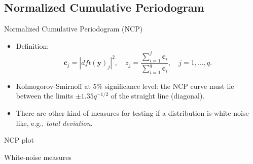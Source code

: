 \documentclass{beamer}
\begin{document}
\subsection{Normalized Cumulative Periodogram}
\begin{frame}{Normalized Cumulative Periodogram (NCP)}
  \begin{itemize}
    \item Definition:
      \begin{equation*}
	\mathbf{c}_{j} = |dft(\mathbf{y})_{j}|^{2}, \quad z_{j} =
	\frac{\sum_{i=1}^{j}\mathbf{c}_{i}}{\sum_{i=1}^{q}\mathbf{c}_{i}},
	\quad j = 1,\ldots,q.
      \end{equation*}

    \item Kolmogorov-Smirnoff at $5\%$ significance level: the NCP curve must
      lie between the limits $\pm 1.35q^{-1/2}$ of the straight line (diagonal).

    \item There are other kind of measures for testing if a distribution is
      white-noise like, e.g., \emph{total deviation}.
    \end{itemize}
\end{frame}

\begin{frame}{NCP plot}
  \begin{center}
  \end{center}
\end{frame}

\begin{frame}{White-noise measures}
  \begin{center}
  \end{center}
\end{frame}
\end{document}
